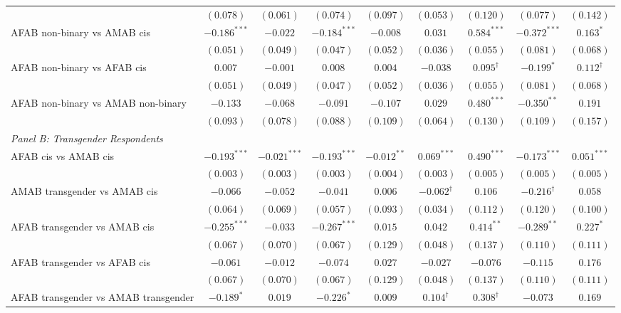 \begin{table}[htpb]
{\begin{tabular}{l c c c c c c c c}
 & $(0.078)$ & $(0.061)$ & $(0.074)$ & $(0.097)$ & $(0.053)$ & $(0.120)$ & $(0.077)$ & $(0.142)$ \\
AFAB non-binary vs AMAB cis & $-0.186^{***}$ & $-0.022$ & $-0.184^{***}$ & $-0.008$ & $0.031$ & $0.584^{***}$ & $-0.372^{***}$ & $0.163^{*}$ \\
 & $(0.051)$ & $(0.049)$ & $(0.047)$ & $(0.052)$ & $(0.036)$ & $(0.055)$ & $(0.081)$ & $(0.068)$ \\
AFAB non-binary vs AFAB cis & $0.007$ & $-0.001$ & $0.008$ & $0.004$ & $-0.038$ & $0.095^{\dagger}$ & $-0.199^{*}$ & $0.112^{\dagger}$ \\
 & $(0.051)$ & $(0.049)$ & $(0.047)$ & $(0.052)$ & $(0.036)$ & $(0.055)$ & $(0.081)$ & $(0.068)$ \\
AFAB non-binary vs AMAB non-binary & $-0.133$ & $-0.068$ & $-0.091$ & $-0.107$ & $0.029$ & $0.480^{***}$ & $-0.350^{**}$ & $0.191$ \\
 & $(0.093)$ & $(0.078)$ & $(0.088)$ & $(0.109)$ & $(0.064)$ & $(0.130)$ & $(0.109)$ & $(0.157)$ \\
\hline
\multicolumn{9}{l}{\textit{Panel B: Transgender Respondents}} \\
AFAB cis vs AMAB cis & $-0.193^{***}$ & $-0.021^{***}$ & $-0.193^{***}$ & $-0.012^{**}$ & $0.069^{***}$ & $0.490^{***}$ & $-0.173^{***}$ & $0.051^{***}$ \\
 & $(0.003)$ & $(0.003)$ & $(0.003)$ & $(0.004)$ & $(0.003)$ & $(0.005)$ & $(0.005)$ & $(0.005)$ \\
AMAB transgender vs AMAB cis & $-0.066$ & $-0.052$ & $-0.041$ & $0.006$ & $-0.062^{\dagger}$ & $0.106$ & $-0.216^{\dagger}$ & $0.058$ \\
 & $(0.064)$ & $(0.069)$ & $(0.057)$ & $(0.093)$ & $(0.034)$ & $(0.112)$ & $(0.120)$ & $(0.100)$ \\
AFAB transgender vs AMAB cis & $-0.255^{***}$ & $-0.033$ & $-0.267^{***}$ & $0.015$ & $0.042$ & $0.414^{**}$ & $-0.289^{**}$ & $0.227^{*}$ \\
 & $(0.067)$ & $(0.070)$ & $(0.067)$ & $(0.129)$ & $(0.048)$ & $(0.137)$ & $(0.110)$ & $(0.111)$ \\
AFAB transgender vs AFAB cis & $-0.061$ & $-0.012$ & $-0.074$ & $0.027$ & $-0.027$ & $-0.076$ & $-0.115$ & $0.176$ \\
 & $(0.067)$ & $(0.070)$ & $(0.067)$ & $(0.129)$ & $(0.048)$ & $(0.137)$ & $(0.110)$ & $(0.111)$ \\
AFAB transgender vs AMAB transgender & $-0.189^{*}$ & $0.019$ & $-0.226^{*}$ & $0.009$ & $0.104^{\dagger}$ & $0.308^{\dagger}$ & $-0.073$ & $0.169$ \\

\end{tabular}}
\end{table}
